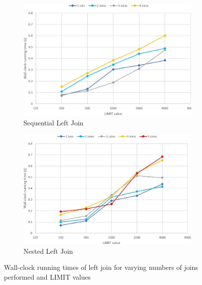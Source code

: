 \documentclass[10pt,a4paper]{article}
\begin{document}
	\begin{figure}[h!]
		\centering
		\begin{subfigure}[b]{0.46\textwidth}
			\hspace{-1cm}
			\centering
			\includegraphics[width=1.1\textwidth]{figures/graph_sequential_left_join}
			\caption{Sequential Left Join}
			\label{fig:seq_left_join}
		\end{subfigure}
		\begin{subfigure}[b]{0.46\textwidth}
			\hspace{1cm}
			\centering
			\includegraphics[width=1.1\textwidth]{figures/graph_nested_left_join}
			\caption{Nested Left Join}
			\label{fig:nested_left_join}
		\end{subfigure}
		\caption{Wall-clock running times of left join for varying numbers of joins performed and LIMIT values}
		\label{fig:left_join}
	\end{figure}
\end{document}
